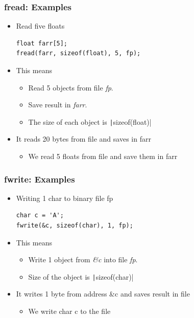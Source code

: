 \documentclass{../c-lecture}
\begin{document}
\begin{frame}[fragile]
  \frametitle{fread: Examples}
  \begin{itemize}
    \item Read five floats
    \begin{verbatim}
float farr[5];
fread(farr, sizeof(float), 5, fp);
    \end{verbatim}
    \item This means
    \begin{itemize}
      \item
        Read \textcolor{YellowOrange}{5} objects from file
        \textit{\color{Violet} fp}.
      \item Save result in \textit{\color{LimeGreen}farr}.
      \item
        The size of each object is
        \texttt|sizeof(float)|
    \end{itemize}
    \item It reads 20 bytes from file and saves in farr
    \begin{itemize}
      \item We read 5 floats from file and save them in farr
    \end{itemize}
  \end{itemize}
\end{frame}

\begin{frame}[fragile]
  \frametitle{fwrite: Examples}
  \begin{itemize}
    \item Writing 1 char to binary file fp
    \begin{verbatim}
char c = 'A';
fwrite(&c, sizeof(char), 1, fp);
    \end{verbatim}
    \item This means
    \begin{itemize}
      \item
        Write \textcolor{YellowOrange}{1} object from
        \textit{\color{LimeGreen} \&c} into file
        \textit{\color{Violet}fp}.
      \item Size of the object is \texttt|sizeof(char)|
    \end{itemize}
    \item It writes 1 byte from address \&c and saves result in file
    \begin{itemize}
      \item We write char c to the file
    \end{itemize}
  \end{itemize}
\end{frame}
\end{document}
